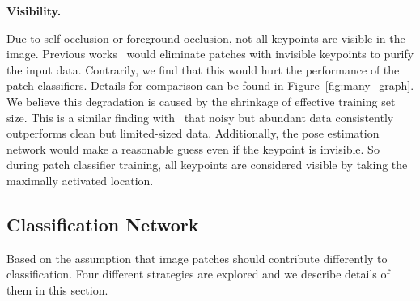 \noindent\textbf{Visibility.} 
\begin{comment}
Due to self-occlusion and foreground-occlusion, some keypoints may be missing from the image. 
One way to deal with keypoint invisibility is to eliminate patches with invisible keypoints. 
The advantage is it keeps a purified dataset with less noisy patches. 
The disadvantage, however, is the reduction of training set size.
Take the CUB dataset as an example, the total effective patch number after elimination is ???., ???\% decrease from the full patch dataset. 
The second strategy is to treat all keypoints as visible and take the maximum activation point as the keypoint location.
As can be seen from Graph [???] this dataset shrinkage affects the patch classifier accuracies negatively compared to full patches. 
Reasons for this include: (1) the unreasonable effectiveness of noisy data and (2) the pose estimation network will make a reasonable guess even if certain keypoints are missing. 
\end{comment}
Due to self-occlusion or foreground-occlusion, not all keypoints are visible in the image. Previous works~\cite{HuangXTZ_CVPR2016} would eliminate patches with invisible keypoints to purify the input data. 
Contrarily, we find that this would hurt the performance of the patch classifiers. Details for comparison can be found in Figure~\ref{fig:many_graph}.
We believe this degradation is caused by the shrinkage of effective training set size. 
This is a similar finding with~\cite{KrauseSHZTDPF_ECCV2016} that noisy but abundant data consistently outperforms clean but limited-sized data. 
Additionally, the pose estimation network would make a reasonable guess even if the keypoint is invisible. 
So during patch classifier training, all keypoints are considered visible by taking the maximally activated location.


\subsection{Classification Network}

Based on the assumption that image patches should contribute differently to classification. Four different strategies are explored and we describe details of them in this section.

